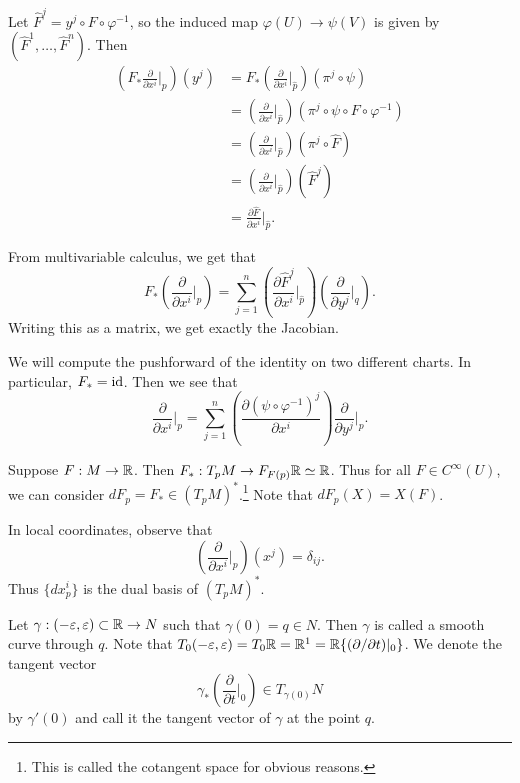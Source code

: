 \documentclass[twoside, 10pt]{article}
\begin{document}
    Let $\widehat{F}^j = y^j \circ F \circ \varphi^{-1}$, so the induced map $\varphi(U) \to \psi(V)$ is given by $(\widehat{F}^1, \ldots, \widehat{F}^n)$. Then 
    \begin{align*}
        \left( F_* \frac{\partial}{\partial x^i}\bigg\vert_p\right) (y^j)
        &= F_* \left( \frac{\partial}{\partial x^i}\bigg\vert_{\widehat{p}} \right) (\pi^j \circ \psi) \\
        &= \left( \frac{\partial}{\partial x^i}\bigg\vert_{\widehat{p}} \right) (\pi^j \circ \psi \circ F \circ \varphi^{-1}) \\
        &= \left( \frac{\partial}{\partial x^i}\bigg\vert_{\widehat{p}} \right) (\pi^j \circ \widehat{F}) \\
        &= \left( \frac{\partial}{\partial x^i}\bigg\vert_{\widehat{p}} \right) (\widehat{F}^j) \\
        &= \frac{\partial \widehat{F}}{\partial x^i}\bigg\vert_{\widehat{p}}.
    \end{align*}

    From multivariable calculus, we get that
    \[ F_* \left( \frac{\partial}{\partial x^i}\bigg\vert_p \right) = \sum_{j=1}^n \left( \frac{\partial \widehat{F}^j}{\partial x^i} \bigg\vert_{\widehat{p}} \right) \left( \frac{\partial}{\partial y^j} \bigg\vert_q \right).\]
    Writing this as a matrix, we get exactly the Jacobian.

    \begin{exm}
        We will compute the pushforward of the identity on two different charts. In particular, $F_* = \mathrm{id}$. Then we see that 
        \[ \frac{\partial}{\partial x^i}\bigg\vert_p = \sum_{j=1}^{n} \left( \frac{\partial (\psi \circ \varphi^{-1})^j}{\partial x^i} \right) \frac{\partial}{\partial y^j} \bigg\vert_p.\]
    \end{exm}

    \begin{exm}
        Suppose $F:M \to \mathbb{R}$. Then $F_*:T_pM \to F_{F(p)}\mathbb{R} \simeq \mathbb{R}$. Thus for all $F \in C^{\infty}(U)$, we can consider $dF_p = F_* \in (T_pM)^*$.\footnote{This is called the cotangent space for obvious reasons.} Note that $dF_p(X) = X(F)$.
    \end{exm}

    In local coordinates, observe that
    \[ \left( \frac{\partial}{\partial x^i} \bigg\vert_p  \right) (x^j) = \delta_{ij}.\] Thus $\{dx^i_p\}$ is the dual basis of $(T_pM)^*$.

    \begin{exm}
        Let $\gamma: (-\varepsilon, \varepsilon) \subset \mathbb{R} \to N$ such that $\gamma(0) = q \in N$. Then $\gamma$ is called a smooth curve through $q$. Note that $T_0(-\varepsilon,\varepsilon) = T_0\mathbb{R} = \mathbb{R}^1 = \mathbb{R}\{(\partial/\partial t)|_0\}$. We denote the tangent vector
        \[\gamma_* \left( \frac{\partial}{\partial t}\bigg\vert_0 \right) \in T_{\gamma(0)}N\] by $\gamma'(0)$ and call it the tangent vector of $\gamma$ at the point $q$.
    \end{exm}
\end{document}
